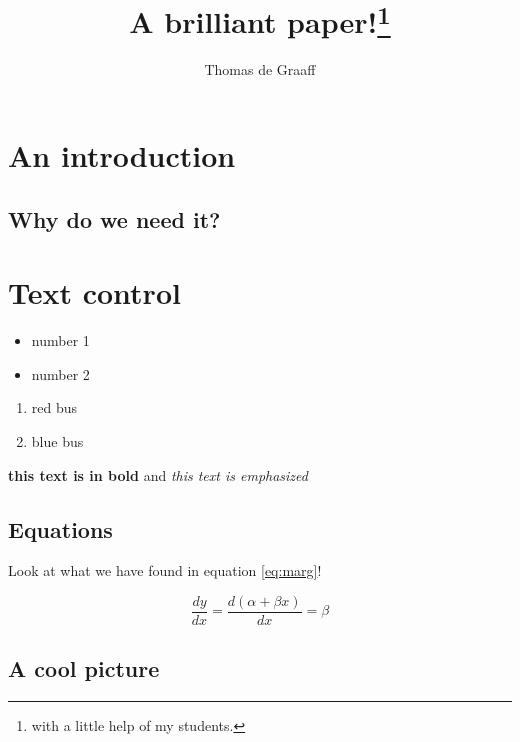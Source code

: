 \documentclass[]{article}
\title{A brilliant paper!\footnote{with a little help of my students.}}
\author{Thomas de Graaff}
\begin{document}
\maketitle

\begin{abstract}
\lipsum[1]
\end{abstract}

\section{An introduction}

\subsection{Why do we need it?}

\lipsum[2]
\cite{Braysy2009,Cruijssen2007, Cruijssen2007a}

\section{Text control}

\begin{itemize}
	\item number 1
	\item number 2
\end{itemize}

\begin{enumerate}
	\item red bus
	\item blue bus
\end{enumerate}

\textbf{this text is in bold} and \emph{this text is emphasized}

\subsection{Equations}

Look at what we have found in equation \ref{eq:marg}!

\begin{equation}
	\frac{dy}{dx} = \frac{d(\alpha + \beta x)}{dx} = \beta
	\label{eq:marg}
\end{equation}

\subsection{A cool picture}
\end{document}
